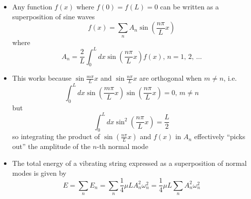 \documentclass{article}
\begin{document}
\begin{itemize}
  \item Any function $f(x)$ where $f(0) = f(L) = 0$ can be written as a superposition of sine waves \[f(x) = \sum_n A_n \sin \left( \frac{n \pi}{L} x \right)\] where \[A_n = \frac{2}{L} \int_0^L dx \sin \left( \frac{n \pi}{L} x \right) f(x), \,n = 1, \,2, \,\ldots\]

  \item This works because $\sin \frac{m \pi}{L} x$ and $\sin \frac{n \pi}{L} x$ are orthogonal when $m \ne n$, i.e. \[\int_0^L dx \sin \left( \frac{m \pi}{L} x \right) \sin \left( \frac{n \pi}{L} x \right) = 0, \,m \ne n\] but \[\int_0^L dx \sin^2 \left( \frac{n \pi}{L} x \right) = \frac{L}{2}\] so integrating the product of $\sin \left( \frac{n \pi}{L} x \right)$ and $f(x)$ in $A_n$ effectively ``picks out'' the amplitude of the $n$-th normal mode

  \item The total energy of a vibrating string expressed as a superposition of normal modes is given by \[E = \sum_n E_n = \sum_n \frac{1}{4} \mu L A_n^2 \omega_n^2 = \frac{1}{4} \mu L \sum_n A_n^2 \omega_n^2\]
\end{itemize}
\end{document}
